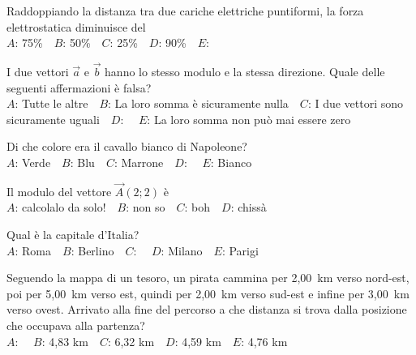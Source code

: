 \mcquestionfooter



\def\mcquestionnumber{6}


\mcquestionheader Raddoppiando la distanza tra due cariche elettriche puntiformi, la forza elettrostatica diminuisce del\\
{$A$}: 75\%\ \ {$B$}: 50\%\ \ {$C$}: 25\%\ \ {$D$}: 90\%\ \ {$E$}: \ \ 

\mcquestionfooter



\def\mcquestionnumber{7}


\mcquestionheader I due vettori $\vec{a}$ e $\vec{b}$ hanno lo stesso modulo e la stessa direzione. Quale delle seguenti affermazioni è falsa?\\
{$A$}: Tutte le altre\ \ {$B$}: La loro somma è sicuramente nulla\ \ {$C$}: I due vettori sono sicuramente uguali\ \ {$D$}: \ \ {$E$}: La loro somma non può mai essere zero\ \ 

\mcquestionfooter



\def\mcquestionnumber{8}


\mcquestionheader Di che colore era il cavallo bianco di Napoleone?\\
{$A$}: Verde\ \ {$B$}: Blu\ \ {$C$}: Marrone\ \ {$D$}: \ \ {$E$}: Bianco\ \ 

\mcquestionfooter



\def\mcquestionnumber{9}


\mcquestionheader Il modulo del vettore $\vec{A}(2;2)$ è\\
{$A$}: calcolalo da solo!\ \ {$B$}: non so\ \ {$C$}: boh\ \ {$D$}: chissà\ \ 

\mcquestionfooter



\def\mcquestionnumber{10}


\mcquestionheader Qual è la capitale d’Italia?\\
{$A$}: Roma\ \ {$B$}: Berlino\ \ {$C$}: \ \ {$D$}: Milano\ \ {$E$}: Parigi\ \ 

\mcquestionfooter



\def\mcquestionnumber{11}


\mcquestionheader Seguendo la mappa di un tesoro, un pirata cammina per 2,00~km verso nord-est, poi per 5,00~km verso est, quindi per 2,00~km verso sud-est e infine per 3,00~km verso ovest. Arrivato alla fine del percorso a che distanza si trova dalla posizione che occupava alla partenza?\\
{$A$}: \ \ {$B$}: 4,83 km\ \ {$C$}: 6,32 km\ \ {$D$}: 4,59 km\ \ {$E$}: 4,76 km\ \ 

